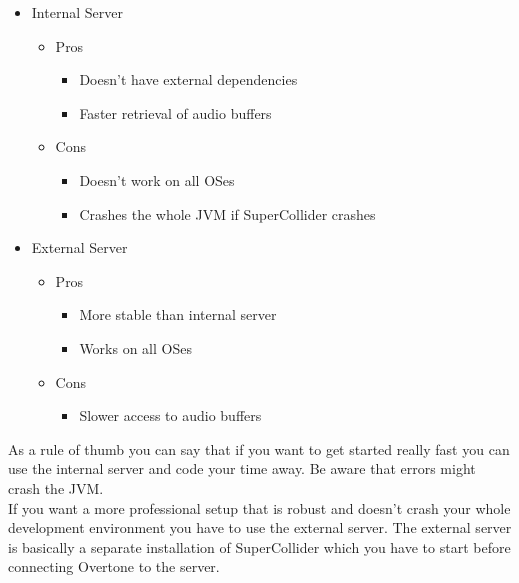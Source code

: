 \begin{itemize}
	\item Internal Server\\
		\begin{itemize}
			\item Pros \\
			\begin{itemize}
				\item Doesn't have external dependencies \\
				\item Faster retrieval of audio buffers \\
			\end{itemize}
			\item Cons \\
			\begin{itemize}
				\item Doesn't work on all OSes \\
				\item Crashes the whole JVM if SuperCollider crashes \\
			\end{itemize}
		\end{itemize}
	\item External Server\\
		\begin{itemize}
			\item Pros \\
			\begin{itemize}
				\item More stable than internal server \\
				\item Works on all OSes \\
			\end{itemize}
			\item Cons \\
			\begin{itemize}
				\item Slower access to audio buffers \\
			\end{itemize}
		\end{itemize}
\end{itemize}

As a rule of thumb you can say that if you want to get started really fast you can use the internal server and code your time away. Be aware that errors might crash the \gls{JVM}.\\
If you want a more professional setup that is robust and doesn't crash your whole development environment you have to use the external server. The external server is basically a separate installation of SuperCollider which you have to start before connecting Overtone to the server.

